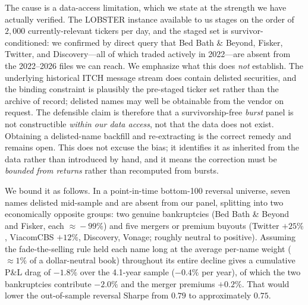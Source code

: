 \documentclass[11pt]{article}
\begin{document}
The cause is a data-access limitation, which we state at the strength we have actually verified. The LOBSTER instance available to us stages on the order of $2{,}000$ currently-relevant tickers per day, and the staged set is survivor-conditioned: we confirmed by direct query that Bed Bath \& Beyond, Fisker, Twitter, and Discovery---all of which traded actively in 2022---are absent from the 2022--2026 files we can reach. We emphasize what this does \emph{not} establish. The underlying historical ITCH message stream does contain delisted securities, and the binding constraint is plausibly the pre-staged ticker set rather than the archive of record; delisted names may well be obtainable from the vendor on request. The defensible claim is therefore that a survivorship-free \emph{burst} panel is not constructible \emph{within our data access}, not that the data does not exist. Obtaining a delisted-name backfill and re-extracting is the correct remedy and remains open. This does not excuse the bias; it identifies it as inherited from the data rather than introduced by hand, and it means the correction must be \emph{bounded from returns} rather than recomputed from bursts.

We bound it as follows. In a point-in-time bottom-100 reversal universe, seven names delisted mid-sample and are absent from our panel, splitting into two economically opposite groups: two genuine bankruptcies (Bed Bath \& Beyond and Fisker, each $\approx\!-99\%$) and five mergers or premium buyouts (Twitter $+25\%$, ViacomCBS $+12\%$, Discovery, Vonage; roughly neutral to positive). Assuming the fade-the-selling rule held each name long at the average per-name weight ($\approx\!1\%$ of a dollar-neutral book) throughout its entire decline gives a cumulative P\&L drag of $-1.8\%$ over the 4.1-year sample ($-0.4\%$ per year), of which the two bankruptcies contribute $-2.0\%$ and the merger premiums $+0.2\%$. That would lower the out-of-sample reversal Sharpe from $0.79$ to approximately $0.75$.
\end{document}
